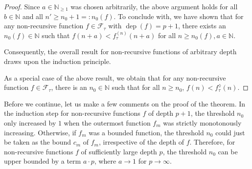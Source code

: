 \begin{proof}
	Since $a\in\mathbb{N}_{\geq 1}$ was chosen arbitrarily, the above argument holds for all $b\in\mathbb{N}$ and all $n'\geq n_0+1=:n_0(f)$. 
	To conclude with, we have shown that for any non-recursive function $f\in \mathcal{F}_{\tau}$ with $\operatorname{dep}(f)=p+1$, there exists an $n_0(f)\in\mathbb{N}$ such that $f(n+a)<f_\tau^{(n)}(n+a)$ for all $n\geq n_0(f),a\in\mathbb{N}$.
	
	Consequently, the overall result for non-recursive functions of arbitrary depth draws upon the induction principle.
	
	As a special case of the above result, we obtain that for any non-recursive function $f\in \mathcal{F}_{\tau}$, there is an $n_0\in\mathbb{N}$ such that for all $n\geq n_0$, $f(n)<f_{\tau}^{\lozenge}(n)$.
	
\end{proof}

Before we continue, let us make a few comments on the proof of the theorem.
In the induction step for non-recursive functions $f$ of depth $p+1$, the threshold $n_0$ only increased by $1$ when the outermost function $f_m$ was strictly monotonously increasing. 
Otherwise, if $f_m$ was a bounded function, the threshold $n_0$ could just be taken as the bound $c_m$ of $f_m$, irrespective of the depth of $f$.
Therefore, for non-recursive functions $f$ of sufficiently large depth $p$, the threshold $n_0$ can be upper bounded by a term $a\cdot p$, where $a\to 1$ for $p\to\infty$.  

